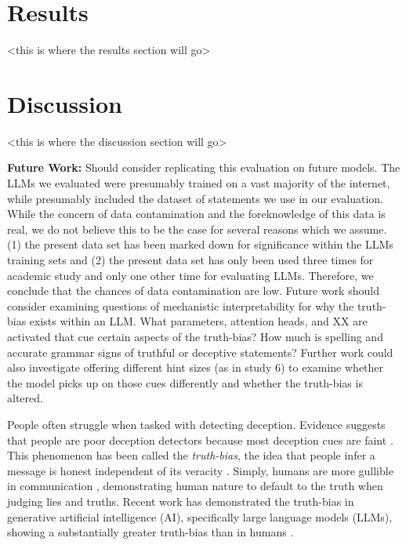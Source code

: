 \documentclass{article}
\begin{document}
\section{Results}

<this is where the results section will go>

\section{Discussion}

<this is where the discussion section will go>

\textbf{Future Work:} Should consider replicating this evaluation on future models. The LLMs we evaluated were presumably trained on a vast majority of the internet, while presumably included the dataset of statements we use in our evaluation. While the concern of data contamination and the foreknowledge of this data is real, we do not believe this to be the case for several reasons which we assume. (1) the present data set has been marked down for significance within the LLMs training sets and (2) the present data set has only been used three times for academic study and only one other time for evaluating LLMs. Therefore, we conclude that the chances of data contamination are low. Future work should consider examining questions of mechanistic interpretability for why the truth-bias exists within an LLM. What parameters, attention heads, and XX are activated that cue certain aspects of the truth-bias? How much is spelling and accurate grammar signs of truthful or deceptive statements? Further work could also investigate offering different hint sizes (as in study 6) to examine whether the model picks up on those cues differently and whether the truth-bias is altered. 

People often struggle when tasked with detecting deception. Evidence suggests that people are poor deception detectors because most deception cues are faint \citep{depaulo_cues_2003, hartwig_why_2011,luke_lessons_2019}. This phenomenon has been called the \textit{truth-bias}, the idea that people infer a message is honest independent of its veracity \citep{levine_truth-default_2014, mclaughlin_communication_2012}. Simply, humans are more gullible in communication \citep{levine_duped_2020}, demonstrating human nature to default to the truth when judging lies and truths. Recent work has demonstrated the truth-bias in generative artificial intelligence (AI), specifically large language models (LLMs), showing a substantially greater truth-bias than in humans \citep{markowitz_generative_2024}.
\end{document}
